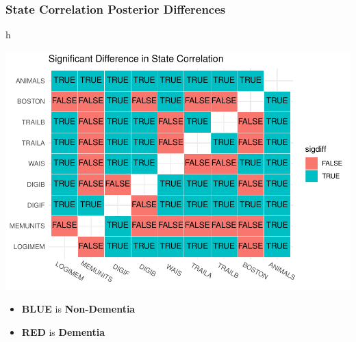 \documentclass[
]{article}
\providecommand{\tightlist}{%
  \setlength{\itemsep}{0pt}\setlength{\parskip}{0pt}}
\begin{document}
\hypertarget{state-correlation-posterior-differences}{%
\subsubsection{State Correlation Posterior Differences}\label{state-correlation-posterior-differences}}

h

\includegraphics{Master_files/figure-latex/unnamed-chunk-42-1.pdf}

\begin{itemize}
\tightlist
\item
  \textbf{BLUE} is \textbf{Non-Dementia}
\item
  \textbf{RED} is \textbf{Dementia}
\end{itemize}
\end{document}
